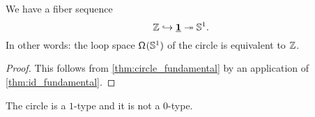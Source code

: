\begin{cor}\label{cor:circle_loopspace}
We have a fiber sequence
\begin{equation*}
\mathbb{Z} \hookrightarrow \underline{\mathbf{1}} \twoheadrightarrow \mathbb{S}^{1}.
\end{equation*}
In other words: the loop space $\mathsf{\Omega}^{}(\mathbb{S}^{1})$ of the circle is equivalent to $\mathbb{Z}$.
\end{cor}

\begin{proof}
This follows from \cref{thm:circle_fundamental} by an application of \cref{thm:id_fundamental}.
\end{proof}

\begin{cor}
The circle is a $1$-type and it is not a $0$-type.
\end{cor}

